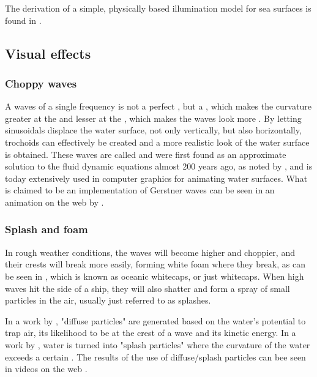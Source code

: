 The derivation of a simple, physically based illumination model for sea surfaces is found in .
\subsection{Visual effects}

\subsubsection{Choppy waves}

A waves of a single frequency is not a perfect \sinusoidal, but a \trochoid, which makes the curvature greater at the  and lesser at the , which makes the waves look more . By letting sinusoidals displace the water surface, not only vertically, but also horizontally, trochoids can effectively be created and a more realistic look of the water surface is obtained. These waves are called  and were first found as an approximate solution to the fluid dynamic equations almost 200 years ago, as noted by \citet{Tessendorf2001}, and is today extensively used in computer graphics for animating water surfaces. What is claimed to be an implementation of Gerstner waves can be seen in an animation on the web by \citet{ceribral2012}.

\subsubsection{Splash and foam}

In rough weather conditions, the waves will become higher and choppier, and their crests will break more easily, forming white foam where they break, as can be seen in , which is known as oceanic whitecaps, or just whitecaps. When high waves hit the side of a ship, they will also shatter and form a spray of small particles in the air, usually just referred to as splashes.

In a work by \citet{Ihmsen2012}, "diffuse particles" are generated based on the water's potential to trap air, its likelihood to be at the crest of a wave and its kinetic energy. In a work by \citet{Takahashi2003}, water is turned into "splash particles" where the curvature of the water exceeds a certain \threshold. The results of the use of diffuse/splash particles can bee seen in videos on the web \citep{Chandel2009,RealFlowLabs2011,Ihmsen2012}.

